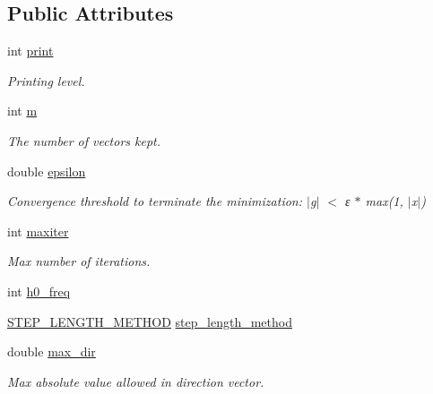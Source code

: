 \subsection*{Public Attributes}
\begin{DoxyCompactItemize}
\item 
int \mbox{\hyperlink{classforte_1_1_l_b_f_g_s___p_a_r_a_m_afdd5c3492553b2b9d9054c379f99d84f}{print}}
\begin{DoxyCompactList}\small\item\em Printing level. \end{DoxyCompactList}\item 
int \mbox{\hyperlink{classforte_1_1_l_b_f_g_s___p_a_r_a_m_ad18715f483efe2d746efbb086c4a2c49}{m}}
\begin{DoxyCompactList}\small\item\em The number of vectors kept. \end{DoxyCompactList}\item 
double \mbox{\hyperlink{classforte_1_1_l_b_f_g_s___p_a_r_a_m_a847271853a38901d91f047d0a765d78a}{epsilon}}
\begin{DoxyCompactList}\small\item\em Convergence threshold to terminate the minimization\+: $\vert$g$\vert$ $<$ ε $\ast$ max(1, $\vert$x$\vert$) \end{DoxyCompactList}\item 
int \mbox{\hyperlink{classforte_1_1_l_b_f_g_s___p_a_r_a_m_ae14e5287f2c8fc27cd93a5d08fd520b7}{maxiter}}
\begin{DoxyCompactList}\small\item\em Max number of iterations. \end{DoxyCompactList}\item 
int \mbox{\hyperlink{classforte_1_1_l_b_f_g_s___p_a_r_a_m_a198ce3d6da0e511c4ea0469e52af9806}{h0\+\_\+freq}}
\item 
\mbox{\hyperlink{classforte_1_1_l_b_f_g_s___p_a_r_a_m_a2651cd29e6c97352a8b72df089d97cfa}{S\+T\+E\+P\+\_\+\+L\+E\+N\+G\+T\+H\+\_\+\+M\+E\+T\+H\+OD}} \mbox{\hyperlink{classforte_1_1_l_b_f_g_s___p_a_r_a_m_a162b78847700b01f76621ab357267172}{step\+\_\+length\+\_\+method}}
\item 
double \mbox{\hyperlink{classforte_1_1_l_b_f_g_s___p_a_r_a_m_a5e799aee5fcd1bcf2253d5c80e7b8ed9}{max\+\_\+dir}}
\begin{DoxyCompactList}\small\item\em Max absolute value allowed in direction vector. \end{DoxyCompactList}\item 

\end{DoxyCompactItemize}
